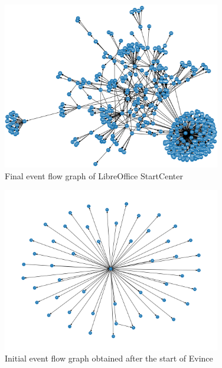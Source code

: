 \begin{figure}[H]
	\centering
	\includegraphics[width=0.85\textwidth,clip]{obrazky-figures/libreoffice_n_end.png}
	\caption{Final event flow graph of LibreOffice StartCenter}
	\label{libreoffice-graph2}
\end{figure}

\begin{figure}[H]
	\centering
	\includegraphics[width=0.85\textwidth,clip]{obrazky-figures/evince_n_start.png}
	\caption{Initial event flow graph obtained after the start of Evince}
	\label{evince-graph1}
\end{figure}

